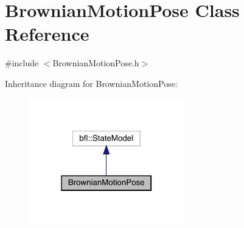 \hypertarget{classBrownianMotionPose}{}\section{Brownian\+Motion\+Pose Class Reference}
\label{classBrownianMotionPose}


{\ttfamily \#include $<$Brownian\+Motion\+Pose.\+h$>$}



Inheritance diagram for Brownian\+Motion\+Pose\+:
\nopagebreak
\begin{figure}[H]
\begin{center}
\leavevmode
\includegraphics[width=190pt]{classBrownianMotionPose__inherit__graph}
\end{center}
\end{figure}

